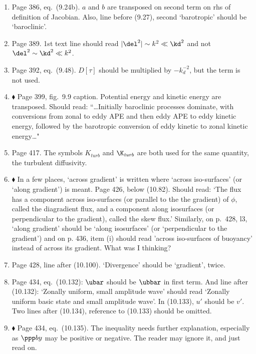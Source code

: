 \documentclass[10pt]{article}
\newcommand{\eq}{eq.\ } \newcommand{\Eq}{Eq.\ }
\renewcommand{\star}{\ensuremath{\blacklozenge} }
\begin{document}
\begin{enumerate}
\item Page 386, \eq (9.24b). $a$ and $b$ are transposed on second term on rhs of definition of Jacobian. Also, line before (9.27), second `barotropic' should be `baroclinic'.

\item Page 389. 1st text line should read $|\del^2| \sim
k^2 \ll \kd^2$ and not $\del^2 \sim
\kd^2 \ll k^2$.

\item Page 392, \eq (9.48). $D[\tau]$ should be multiplied by $-k_d^{-2}$, but the term is not used.

\item \star \label{simmhosk} Page 399, fig.\ 9.9 caption.  Potential energy and kinetic energy are transposed. Should read: ``\ldots Initially baroclinic processes dominate, with conversions from zonal to eddy APE and then eddy APE to eddy kinetic energy, followed by the barotropic conversion of eddy kinetic to zonal kinetic energy\ldots"

\item Page 417. The symbols $K_\textit{turb}$ and $\K_\textit{turb}$ are both used for the same quantity, the turbulent diffusivity.

\item \star In a few places, `across gradient' is written where `across iso-surfaces' (or `along gradient') is meant. Page 426, below (10.82). Should read: `The flux has a component across iso-surfaces (or parallel to the the gradient) of $\phi$, called the diagradient flux, and a component along isosurfaces (or perpendicular to the gradient), called the skew flux.' Similarly, on p.\ 428, l3, `along gradient' should be `along isosurfaces' (or `perpendicular to the gradient') and on p. 436, item (i) should read 'across iso-surfaces of buoyancy' instead of across its gradient. What was I thinking?

\item Page 428, line after (10.100). `Divergence' should be `gradient', twice.

\item Page 434, \eq (10.132): $\ubar$ should be $\ubbar$ in first term. And line after (10.132): `Zonally uniform, small amplitude wave' should read `Zonally uniform basic state and small amplitude wave'. In (10.133), $u'$ should be $v'$. Two lines after (10.134), reference to (10.133) should be omitted.

\item \star Page 434, \eq (10.135). The inequality needs further explanation, especially as $\ppp by $ may be positive or negative.  The reader may ignore it, and just read on.


\end{enumerate}
\end{document}
